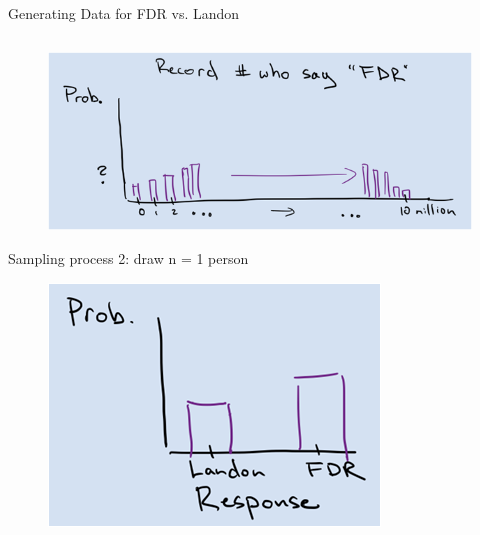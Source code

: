 \documentclass[aspectratio=169]{../latex_main/tntbeamer}  %
\begin{document}
\begin{frame}{Generating Data for FDR vs. Landon}
\begin{columns}
\begin{column}{.4\textwidth}
	           
                \begin{figure}
                    \includegraphics[scale=.4]{Bild14}
                \end{figure}
                Sampling process 2: draw n = 1 person
                \begin{figure}
                    \includegraphics[scale=.4]{Bild15}
                \end{figure}
	        \end{column}
	    \end{columns}
	\end{frame}
	
\end{document}
